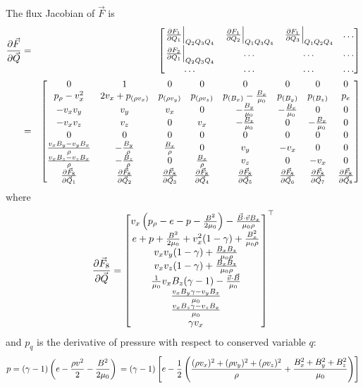 \documentclass[%
 reprint,
 amsmath,amssymb,
 aps,
]{revtex4-2}
\begin{document}
The flux Jacobian of $\vec F$ is
\begin{eqnarray}
\pdv{\vec F}{\vec Q} & = & \begin{bmatrix} \left. \pdv{F_1}{Q_1} \right|_{Q_2 Q_3 Q_4} & \left. \pdv{F_1}{Q_2} \right|_{Q_1 Q_3 Q_4} & \left. \pdv{F_1}{Q_3} \right|_{Q_1 Q_2 Q_4} & \ldots\\
\left. \pdv{F_2}{Q_1} \right|_{Q_2 Q_3 Q_4} & \ldots & \ldots & \ldots \\
\ldots & \ldots & \ldots & \ldots 
\end{bmatrix} \\
& = & \begin{bmatrix}
0  &  1  &  0  &  0  &  0  &  0  &  0  &  0 \\
p_\rho - v_x ^2 & 2 v_x + p_{(\rho v_x)}  & p_{(\rho v_y)} & p_{(\rho v_z)} & p_{(B_x)} - \frac{B_x}{\mu_0}  & p_{(B_y)} & p_{(B_z)} & p_e \\
-v_x v_y & v_y & v_x & 0 & - \frac{B_y}{\mu_0} & - \frac{B_x}{\mu_0} & 0 & 0 \\
-v_x v_z & v_z & 0 & v_x & - \frac{B_z}{\mu_0} & 0 & - \frac{B_x}{\mu_0} & 0 \\
0 & 0 & 0 & 0 & 0 & 0 & 0 & 0 \\
\frac{v_x B_y - v_y B_x}{\rho} & - \frac{B_y}{\rho} & \frac{B_x}{\rho} & 0 & v_y & - v_x & 0 & 0 \\
\frac{v_x B_z - v_z B_x}{\rho} & - \frac{B_z}{\rho} & 0 & \frac{B_x}{\rho} & v_z & 0 & -v_x & 0 \\
\pdv{\vec F_8}{\vec Q_1} & \pdv{\vec F_8}{\vec Q_2} & \pdv{\vec F_8}{\vec Q_3} & \pdv{\vec F_8}{\vec Q_4} & \pdv{\vec F_8}{\vec Q_5} & \pdv{\vec F_8}{\vec Q_6} & \pdv{\vec F_8}{\vec Q_7} & \pdv{\vec F_8}{\vec Q_8} 
\end{bmatrix}
\end{eqnarray}
where 
\begin{equation}
\pdv{\vec F_8}{\vec Q} = 
\begin{bmatrix}
v_x \left(p_\rho - e - p - \frac{B^2}{2 \mu_0}\right) - \frac{\vec B \cdot \vec v B_x}{\mu_0 \rho} \\
e + p + \frac{B^2}{2 \mu_0} + v_x ^2 (1 - \gamma) + \frac{B_x ^2}{\mu_0 \rho} \\
v_x v_y (1 - \gamma) + \frac{B_x B_z}{\mu_0 \rho} \\
v_x v_z (1 - \gamma) + \frac{B_x B_z}{\mu_0 \rho} \\
\frac{1}{\mu_0} v_x B_z (\gamma - 1) - \frac{\vec v \cdot \vec B}{\mu_0} \\
\frac{v_x B_y \gamma - v_y B_x}{\mu_0} \\
\frac{v_x B_z \gamma - v_z B_x}{\mu_0} \\
\gamma v_x
\end{bmatrix}^\top
\end{equation}
and $p_q$ is the derivative of pressure with respect to conserved variable $q$:
\begin{equation}
p = (\gamma - 1) \left(e - \frac{\rho v^2}{2} - \frac{B^2}{2 \mu_0} \right) \\
= (\gamma - 1) \left[ e - \frac{1}{2} \left( \frac{(\rho v_x)^2 + (\rho v_y)^2 + (\rho v_z)^2}{\rho} + \frac{B_x ^2 + B_y ^2 + B_z ^2}{\mu_0} \right) \right]
\end{equation}
\end{document}
